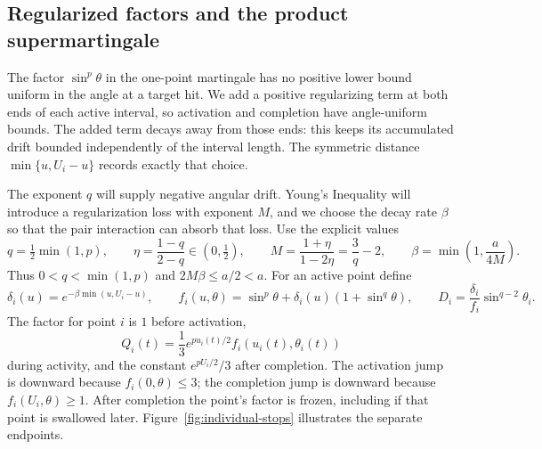 \subsection{Regularized factors and the product supermartingale}

The factor $\sin^p\theta$ in the one-point martingale has no positive
lower bound uniform in the angle at a target hit. We add a positive
regularizing term at both ends of each active interval, so activation
and completion have angle-uniform bounds. The added term decays away
from those ends: this keeps its accumulated drift bounded independently
of the interval length. The symmetric distance
$\min\{u,U_i-u\}$ records exactly that choice.

The exponent $q$ will supply negative angular drift. Young's Inequality
will introduce a regularization loss with exponent $M$, and we choose
the decay rate $\beta$ so that the pair interaction can absorb that loss.
Use the explicit values
\begin{equation}
 q=\tfrac12\min(1,p),\qquad
 \eta=\frac{1-q}{2-q}\in(0,\tfrac12),\qquad
 M=\frac{1+\eta}{1-2\eta}=\frac3q-2,\qquad
 \beta=\min\left(1,\frac a{4M}\right).
 \label{mp:parameters}
\end{equation}
Thus $0<q<\min(1,p)$ and $2M\beta\le a/2<a$. For an active point
define
\begin{equation}
 \delta_i(u)=e^{-\beta\min(u,U_i-u)},\qquad
 f_i(u,\theta)=\sin^p\theta+\delta_i(u)(1+\sin^q\theta),\qquad
 D_i=\frac{\delta_i}{f_i}\sin^{q-2}\theta_i.
 \label{mp:factors}
\end{equation}
The factor for point $i$ is $1$ before activation,
\[
 Q_i(t)=\frac13 e^{pu_i(t)/2}f_i(u_i(t),\theta_i(t))
\]
during activity, and the constant $e^{pU_i/2}/3$ after completion.
The activation jump is downward because $f_i(0,\theta)\le3$;
the completion jump is downward because $f_i(U_i,\theta)\ge1$.
After completion the point's factor is frozen, including if that point
is swallowed later. Figure~\ref{fig:individual-stops} illustrates the
separate endpoints.


